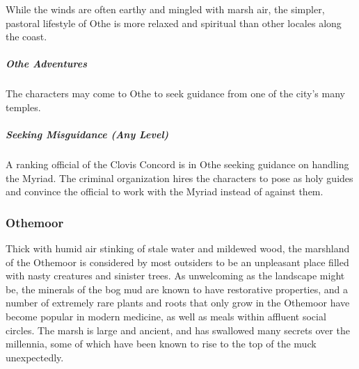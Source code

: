 \documentclass[10pt,a4paper,twoside,bg=print,twocolumn,openany,nodeprecatedcode]{dndbook}
\begin{document}
While the winds are often earthy and mingled with marsh air, the simpler, pastoral lifestyle of Othe is more relaxed and spiritual than other locales along the coast.

\subparagraph{Othe Adventures}
The characters may come to Othe to seek guidance from one of the city's many temples.

\subparagraph{Seeking Misguidance (Any Level)}
A ranking official of the Clovis Concord is in Othe seeking guidance on handling the Myriad. The criminal organization hires the characters to pose as holy guides and convince the official to work with the Myriad instead of against them.

\subsubsection{Othemoor}
Thick with humid air stinking of stale water and mildewed wood, the marshland of the Othemoor is considered by most outsiders to be an unpleasant place filled with nasty creatures and sinister trees. As unwelcoming as the landscape might be, the minerals of the bog mud are known to have restorative properties, and a number of extremely rare plants and roots that only grow in the Othemoor have become popular in modern medicine, as well as meals within affluent social circles. The marsh is large and ancient, and has swallowed many secrets over the millennia, some of which have been known to rise to the top of the muck unexpectedly.
\end{document}
